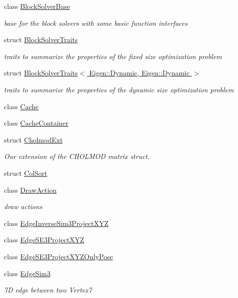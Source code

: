 \begin{DoxyCompactItemize}
class \hyperlink{classg2o_1_1BlockSolverBase}{Block\+Solver\+Base}
\begin{DoxyCompactList}\small\item\em base for the block solvers with some basic function interfaces \end{DoxyCompactList}\item 
struct \hyperlink{structg2o_1_1BlockSolverTraits}{Block\+Solver\+Traits}
\begin{DoxyCompactList}\small\item\em traits to summarize the properties of the fixed size optimization problem \end{DoxyCompactList}\item 
struct \hyperlink{structg2o_1_1BlockSolverTraits_3_01Eigen_1_1Dynamic_00_01Eigen_1_1Dynamic_01_4}{Block\+Solver\+Traits$<$ Eigen\+::\+Dynamic, Eigen\+::\+Dynamic $>$}
\begin{DoxyCompactList}\small\item\em traits to summarize the properties of the dynamic size optimization problem \end{DoxyCompactList}\item 
class \hyperlink{classg2o_1_1Cache}{Cache}
\item 
class \hyperlink{classg2o_1_1CacheContainer}{Cache\+Container}
\item 
struct \hyperlink{structg2o_1_1CholmodExt}{Cholmod\+Ext}
\begin{DoxyCompactList}\small\item\em Our extension of the C\+H\+O\+L\+M\+OD matrix struct. \end{DoxyCompactList}\item 
struct \hyperlink{structg2o_1_1ColSort}{Col\+Sort}
\item 
class \hyperlink{classg2o_1_1DrawAction}{Draw\+Action}
\begin{DoxyCompactList}\small\item\em draw actions \end{DoxyCompactList}\item 
class \hyperlink{classg2o_1_1EdgeInverseSim3ProjectXYZ}{Edge\+Inverse\+Sim3\+Project\+X\+YZ}
\item 
class \hyperlink{classg2o_1_1EdgeSE3ProjectXYZ}{Edge\+S\+E3\+Project\+X\+YZ}
\item 
class \hyperlink{classg2o_1_1EdgeSE3ProjectXYZOnlyPose}{Edge\+S\+E3\+Project\+X\+Y\+Z\+Only\+Pose}
\item 
class \hyperlink{classg2o_1_1EdgeSim3}{Edge\+Sim3}
\begin{DoxyCompactList}\small\item\em 7D edge between two Vertex7 \end{DoxyCompactList}\item 

\end{DoxyCompactItemize}
